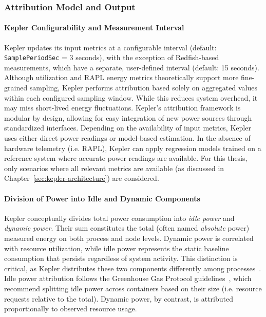 \subsubsection{Attribution Model and Output}
\label{sec:kepler-attribution}

\paragraph{Kepler Configurability and Measurement Interval}
Kepler updates its input metrics at a configurable interval (default: \texttt{SamplePeriodSec} = 3 seconds), with the exception of Redfish-based measurements, which have a separate, user-defined interval (default: 15 seconds). Although utilization and RAPL energy metrics theoretically support more fine-grained sampling, Kepler performs attribution based solely on aggregated values within each configured sampling window. While this reduces system overhead, it may miss short-lived energy fluctuations. Kepler's attribution framework is modular by design, allowing for easy integration of new power sources through standardized interfaces. Depending on the availability of input metrics, Kepler uses either direct power readings or model-based estimation. In the absence of hardware telemetry (i.e. RAPL), Kepler can apply regression models trained on a reference system where accurate power readings are available. For this thesis, only scenarios where all relevant metrics are available (as discussed in Chapter~\ref{sec:kepler-architecture}) are considered.

\paragraph{Division of Power into Idle and Dynamic Components}
Kepler conceptually divides total power consumption into \emph{idle power} and \emph{dynamic power}. Their sum constitutes the total (often named \emph{absolute} power) measured energy on both process and node levels. Dynamic power is correlated with resource utilization, while idle power represents the static baseline consumption that persists regardless of system activity. This distinction is critical, as Kepler distributes these two components differently among processes~\parencite{amaral2023exploring}. Idle power attribution follows the Greenhouse Gas Protocol guidelines~\parencite{gesi2024ictguidance}, which recommend splitting idle power across containers based on their size (i.e. resource requests relative to the total). Dynamic power, by contrast, is attributed proportionally to observed resource usage.

